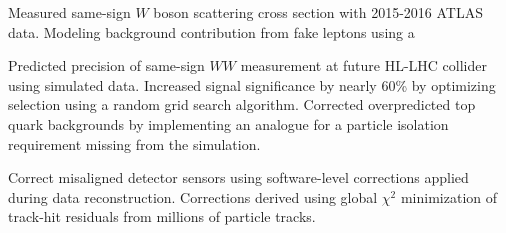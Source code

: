 \documentclass[11pt]{res}
\begin{document}
\begin{resume}
   Measured same-sign $W$ boson scattering cross section with 2015-2016 ATLAS data. Modeling background contribution from fake leptons using a 

   Predicted precision of same-sign $WW$ measurement at future HL-LHC collider using simulated data. Increased signal significance by nearly 60\% by optimizing selection using a random grid search algorithm. Corrected overpredicted top quark backgrounds by implementing an analogue for a particle isolation requirement missing from the simulation.

   Correct misaligned detector sensors using software-level corrections applied during data reconstruction. Corrections derived using global $\chi^2$ minimization of track-hit residuals from millions of particle tracks.

%   


\end{resume}
\end{document}
